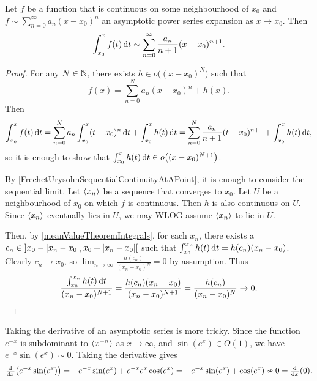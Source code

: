 \begin{proposition}
Let $f$ be a function that is continuous on some neighbourhood of $x_0$ and $f \sim \sum_{n=0}^\infty a_n(x-x_0)^n$ an asymptotic power series expansion as $x\to x_0$. Then
\[ \int_{x_0}^x f(t) \operatorname{d \!}{t} \sim \sum_{n=0}^\infty \frac{a_n}{n+1}(x-x_0)^{n+1}. \]
\end{proposition}
\begin{proof}
For any $N\in \mathbb{N}$, there exists $h\in o\big((x-x_0)^N\big)$ such that
\[ f(x) = \sum_{n=0}^N a_n(x-x_0)^n + h(x). \]
Then
\[ \int_{x_0}^x f(t)\operatorname{d \!}{t} = \sum_{n=0}^N a_n \int_{x_0}^x (t-x_0)^n\operatorname{d \!}{t} + \int_{x_0}^xh(t)\operatorname{d \!}{t} = \sum_{n=0}^N \frac{a_n}{n+1} (t-x_0)^{n+1} + \int_{x_0}^xh(t)\operatorname{d \!}{t}, \]
so it is enough to show that $\int_{x_0}^xh(t)\operatorname{d \!}{t}\in o\big((x-x_0)^{N+1}\big)$. 

By \ref{FrechetUrysohnSequentialContinuityAtAPoint}, it is enough to consider the sequential limit. Let $\left\langle x_n \right\rangle$ be a sequence that converges to $x_0$. Let $U$ be a neighbourhood of $x_0$ on which $f$ is continuous. Then $h$ is also continuous on $U$. Since $\left\langle x_n \right\rangle$ eventually lies in $U$, we may WLOG assume $\left\langle x_n \right\rangle$ to lie in $U$.

Then, by \ref{meanValueTheoremIntegrals}, for each $x_n$, there exists a $c_n\in \interval[o]{\big.x_0 - |x_n-x_0|, x_0 + |x_n-x_0|}$ such that $\int_{x_0}^{x_n}h(t)\operatorname{d \!}{t} = h(c_n)(x_n - x_0)$. Clearly $c_n \to x_0$, so $\lim_{n\to \infty} \frac{h(c_n)}{(x_n-x_0)^N} = 0$ by assumption. Thus
\[ \frac{\int_{x_0}^{x_n}h(t)\operatorname{d \!}{t}}{(x_n-x_0)^{N+1}} = \frac{h(c_n)(x_n - x_0)}{(x_n-x_0)^{N+1}} = \frac{h(c_n)}{(x_n-x_0)^N} \to 0. \]
\end{proof}

\begin{example}
Taking the derivative of an asymptotic series is more tricky. Since the function $e^{-x}$ is subdominant to $\left\langle x^{-n} \right\rangle$ as $x\to \infty$, and $\sin(e^x) \in O(1)$, we have $e^{-x}\sin(e^x)\sim 0$. Taking the derivative gives
\[ \od{}{x}\big(e^{-x}\sin(e^x)\big) = -e^{-x}\sin(e^x)+ e^{-x}e^x\cos(e^x) = -e^{-x}\sin(e^x)+ \cos(e^x) \nsim 0 = \od{}{x}(0). \]
\end{example}



